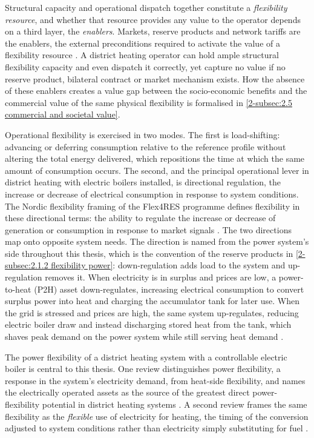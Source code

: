 Structural capacity and operational dispatch together constitute a \textit{flexibility resource}, and whether that resource provides any value to the operator depends on a third layer, the \textit{enablers}. Markets, reserve products and network tariffs are the enablers, the external preconditions required to activate the value of a flexibility resource \cite{degefa_comprehensive_2021, saele_understanding_2023}. A district heating operator can hold ample structural flexibility capacity and even dispatch it correctly, yet capture no value if no reserve product, bilateral contract or market mechanism exists. How the absence of these enablers creates a value gap between the socio-economic benefits and the commercial value of the same physical flexibility is formalised in \autoref{2-subsec:2.5 commercial and societal value}.

Operational flexibility is exercised in two modes. The first is load-shifting: advancing or deferring consumption relative to the reference profile without altering the total energy delivered, which repositions the time at which the same amount of consumption occurs. The second, and the principal operational lever in district heating with electric boilers installed, is directional regulation, the increase or decrease of electrical consumption in response to system conditions. The Nordic flexibility framing of the Flex4RES programme defines flexibility in these directional terms: the ability to regulate the increase or decrease of generation or consumption in response to market signals \cite{skytte_flexible_2019}. The two directions map onto opposite system needs. The direction is named from the power system's side throughout this thesis, which is the convention of the reserve products in \autoref{2-subsec:2.1.2 flexibility power}: down-regulation adds load to the system and up-regulation removes it. When electricity is in surplus and prices are low, a power-to-heat (P2H) asset down-regulates, increasing electrical consumption to convert surplus power into heat and charging the accumulator tank for later use. When the grid is stressed and prices are high, the same system up-regulates, reducing electric boiler draw and instead discharging stored heat from the tank, which shaves peak demand on the power system while still serving heat demand \cite{golmohamadi_integration_2022}.

The power flexibility of a district heating system with a controllable electric boiler is central to this thesis. One review distinguishes power flexibility, a response in the system's electricity demand, from heat-side flexibility, and names the electrically operated assets as the source of the greatest direct power-flexibility potential in district heating systems \cite{golmohamadi_integration_2022}. A second review frames the same flexibility as the \textit{flexible} use of electricity for heating, the timing of the conversion adjusted to system conditions rather than electricity simply substituting for fuel \cite{bloes_power--heat_2018}. 

